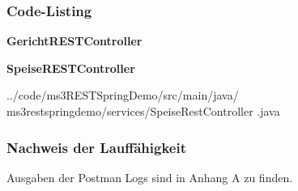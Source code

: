 \subsubsection{Code-Listing}

\begin{mdframed}[style=codebox]
\textbf{GerichtRESTController}

\end{mdframed}

\begin{mdframed}[style=codebox]
\textbf{SpeiseRESTController}

{%
  ../code/ms3RESTSpringDemo/src/main/java/%
  ms3restspringdemo/services/SpeiseRestController%
  .java
}
\end{mdframed}


\subsubsection{Nachweis der Lauff\"ahigkeit}

Ausgaben der Postman Logs sind in Anhang A zu finden.



